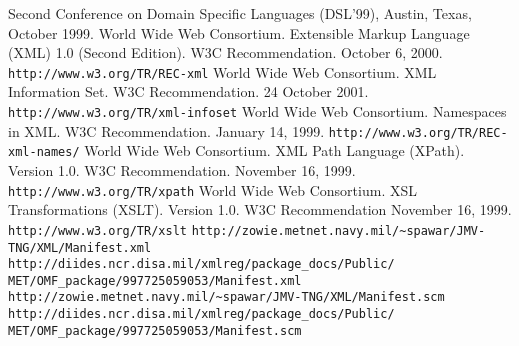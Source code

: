 \documentclass[10pt]{llncs}
\begin{document}
\begin{thebibliography}{10}
Second Conference on Domain Specific Languages (DSL'99), Austin,
Texas, October 1999.
 World Wide Web Consortium. Extensible Markup Language (XML)
1.0 (Second Edition). W3C Recommendation. October 6, 2000. \texttt{http://www.w3.org/TR/REC-xml} 
 World Wide Web Consortium. XML Information Set.  W3C Recommendation. 24 October 2001. \texttt{http://www.w3.org/TR/xml-infoset} 
 World Wide Web Consortium. Namespaces in XML. W3C Recommendation. January 14, 1999. \texttt{http://www.w3.org/TR/REC-xml-names/} 
 World Wide Web Consortium. XML Path Language (XPath).
 Version 1.0. W3C Recommendation. November 16, 1999. \texttt{http://www.w3.org/TR/xpath} 
 World Wide Web Consortium. XSL Transformations (XSLT). Version 1.0.
W3C Recommendation November 16, 1999. \texttt{http://www.w3.org/TR/xslt} 
  \texttt{http://zowie.metnet.navy.mil/\textasciitilde{}spawar/JMV-TNG/XML/Manifest.xml}  \texttt{http://diides.ncr.disa.mil/xmlreg/package\_docs/Public/ MET/OMF\_package/997725059053/Manifest.xml} 
  \texttt{http://zowie.metnet.navy.mil/\textasciitilde{}spawar/JMV-TNG/XML/Manifest.scm}  \texttt{http://diides.ncr.disa.mil/xmlreg/package\_docs/Public/ MET/OMF\_package/997725059053/Manifest.scm} 
\end{thebibliography}
\end{document}
